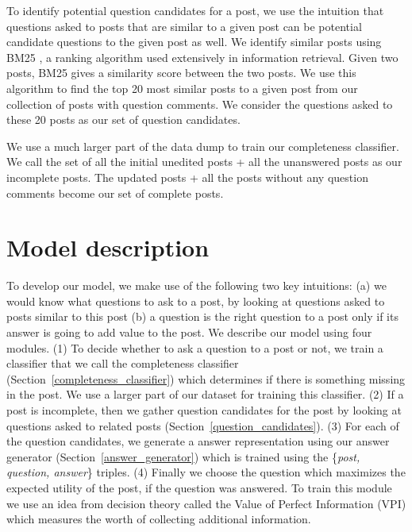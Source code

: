 \documentclass[11pt]{article}
\begin{document}
To identify potential question candidates for a post, we use the intuition that questions asked to posts that are similar to a given post can be potential candidate questions to the given post as well. We identify similar posts using BM25 \cite{robertson2009probabilistic}, a ranking algorithm used extensively in information retrieval. Given two posts, BM25 gives a similarity score between the two posts. We use this algorithm to find the top 20 most similar posts to a given post from our collection of posts with question comments. We consider the questions asked to these 20 posts as our set of question candidates.


We use a much larger part of the data dump to train our completeness classifier. We call the set of all the initial unedited posts + all the unanswered posts as our incomplete posts. The updated posts + all the posts without any question comments become our set of complete posts. 

\section{Model description}\label{model}

To develop our model, we make use of the following two key intuitions: (a) we would know what questions to ask to a post, by looking at questions asked to posts similar to this post (b) a question is the right question to a post only if its answer is going to add value to the post. We describe our model using four modules. (1) To decide whether to ask a question to a post or not, we train a classifier  that we call the completeness classifier (Section~\ref{completeness_classifier}) which determines if there is something missing in the post. We use a larger part of our dataset for training this classifier. (2) If a post is incomplete, then we gather question candidates for the post by looking at questions asked to related posts (Section~\ref{question_candidates}). (3) For each of the question candidates, we generate a answer representation using our answer generator (Section~\ref{answer_generator}) which is trained using the \{\textit{post, question, answer}\} triples. (4) Finally we choose the question which maximizes the expected utility of the post, if the question was answered. To train this module we use an idea from decision theory called the Value of Perfect Information (VPI) which measures the worth of collecting additional information. 
\end{document}
